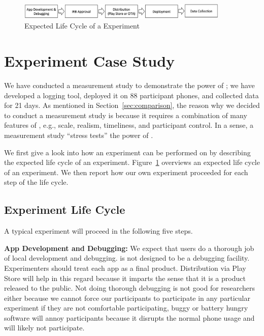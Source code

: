 \begin{figure}[t]
\centering
\includegraphics[width=0.9\textwidth]{experiment-life-cycle.pdf}
\caption{Expected Life Cycle of a \PhoneLab{} Experiment}
\label{fig:experiment-life-cycle}
\end{figure}

\section{Experiment Case Study}
\label{sec-experiment}

We have conducted a measurement study to demonstrate the power of \PhoneLab{};
we have developed a logging tool, deployed it on 88 participant phones, and
collected data for 21 days. As mentioned in Section~\ref{sec:comparison}, the
reason why we decided to conduct a measurement study is because it requires a
combination of many features of \PhoneLab{}, e.g., scale, realism, timeliness,
and participant control. In a sense, a measurement study ``stress tests'' the
power of \PhoneLab{}.

We first give a look into how an experiment can be performed on \PhoneLab{} by
describing the expected life cycle of an experiment.
Figure~\ref{fig:experiment-life-cycle} overviews an expected life cycle of an
experiment. We then report how our own experiment proceeded for each step of the
life cycle.

\subsection{Experiment Life Cycle}

A typical \PhoneLab{} experiment will proceed in the following five steps.

{\bf App Development and Debugging:}
We expect that \PhoneLab{} users do a thorough job of local development and
debugging. \PhoneLab{} is not designed to be a debugging facility. Experimenters
should treat each app as a final product. Distribution via Play Store will help
in this regard because it imparts the sense that it is a product released to the
public. Not doing thorough debugging is not good for researchers either because
we cannot force our participants
to participate in any particular experiment if they are not comfortable 
participating, buggy or battery hungry software will annoy participants because
it disrupts the normal phone usage and will likely not participate.

